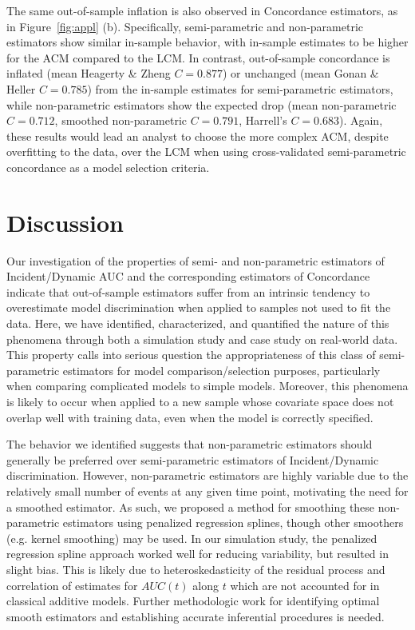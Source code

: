 \documentclass[useAMS,usenatbib, referee]{biom}
\begin{document}
The same out-of-sample inflation is also observed in Concordance estimators, as in Figure~\ref{fig:appl} (b). Specifically, semi-parametric and non-parametric estimators show similar in-sample behavior, with in-sample estimates to be higher for the ACM compared to the LCM. In contrast, out-of-sample concordance is inflated (mean Heagerty \& Zheng $C=0.877$) or unchanged (mean Gonan \& Heller $C = 0.785$) from the in-sample estimates for semi-parametric estimators, while non-parametric estimators show the expected drop (mean non-parametric $C=0.712$, smoothed non-parametric $C=0.791$, Harrell's $C=0.683$). Again, these results would lead an analyst to choose the more complex ACM, despite overfitting to the data, over the LCM when using cross-validated semi-parametric concordance as a model selection criteria. 

\section{Discussion}
\label{sec:discussion}

Our investigation of the properties of semi- and non-parametric estimators of Incident/Dynamic AUC and the corresponding estimators of Concordance indicate that out-of-sample estimators suffer from an intrinsic tendency to overestimate model discrimination when applied to samples not used to fit the data. Here, we have identified, characterized, and quantified the nature of this phenomena through both a simulation study and case study on real-world data. This property calls into serious question the appropriateness of this class of semi-parametric estimators for model comparison/selection purposes, particularly when comparing complicated models to simple models. Moreover, this phenomena is likely to occur when applied to a new sample whose covariate space does not overlap well with training data, even when the model is correctly specified. 

The behavior we identified suggests that non-parametric estimators should generally be preferred over semi-parametric estimators of Incident/Dynamic discrimination. However, non-parametric estimators are highly variable due to the relatively small number of events at any given time point, motivating the need for a smoothed estimator. As such, we proposed a method for smoothing these non-parametric estimators using penalized regression splines, though other smoothers (e.g. kernel smoothing) may be used. In our simulation study, the penalized regression spline approach worked well for reducing variability, but resulted in slight bias. This is likely due to heteroskedasticity of the residual process and correlation of estimates for $AUC(t)$ along $t$ which are not accounted for in classical additive models. Further methodologic work for identifying optimal smooth estimators and establishing accurate inferential procedures is needed. 
\end{document}
